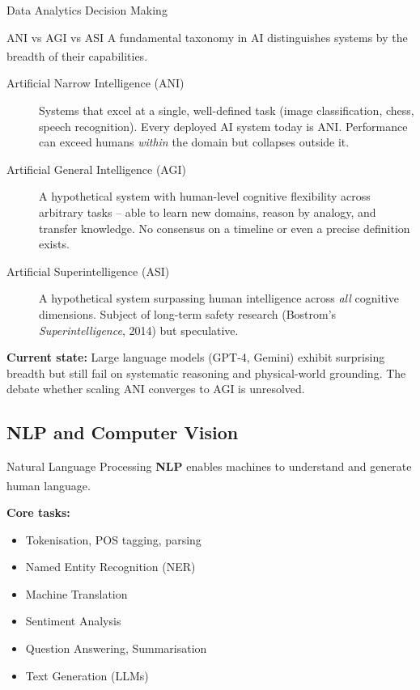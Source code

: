 \begin{v3topic}{Data Analytics Decision Making}
\begin{v3topic}{ANI vs AGI vs ASI}
        A fundamental taxonomy in AI distinguishes systems by the breadth of their capabilities.\textsuperscript{\cite{adjaouteAI2024}}

        \begin{description}
            \item[Artificial Narrow Intelligence (ANI)] Systems that excel at a single, well-defined task (image classification, chess, speech recognition). Every deployed AI system today is ANI. Performance can exceed humans \emph{within} the domain but collapses outside it.
            \item[Artificial General Intelligence (AGI)] A hypothetical system with human-level cognitive flexibility across arbitrary tasks -- able to learn new domains, reason by analogy, and transfer knowledge. No consensus on a timeline or even a precise definition exists.
            \item[Artificial Superintelligence (ASI)] A hypothetical system surpassing human intelligence across \emph{all} cognitive dimensions. Subject of long-term safety research (Bostrom's \emph{Superintelligence}, 2014) but speculative.
        \end{description}

        \textbf{Current state:} Large language models (GPT-4, Gemini) exhibit surprising breadth but still fail on systematic reasoning and physical-world grounding. The debate whether scaling ANI converges to AGI is unresolved.
\end{v3topic}

    \subsection{NLP and Computer Vision}

\begin{v3topic}{Natural Language Processing}
        \textbf{NLP} enables machines to understand and generate human language.\textsuperscript{\cite{adjaouteAI2024}}

        \textbf{Core tasks:}
        \begin{itemize}
            \item Tokenisation, POS tagging, parsing
            \item Named Entity Recognition (NER)
            \item Machine Translation
            \item Sentiment Analysis
            \item Question Answering, Summarisation
            \item Text Generation (LLMs)
        \end{itemize}


\end{v3topic}
\end{v3topic}
